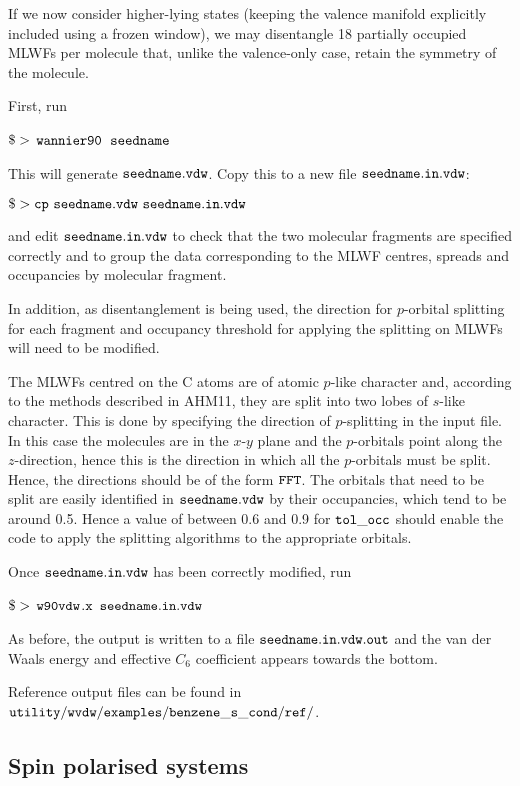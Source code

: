 \documentclass{report}
\newcommand{\wvdw}{{$\tt{w90vdw}$}}
\newcommand{\wannier}{{$\tt{wannier90}$}}
\begin{document}
If we now consider higher-lying states (keeping the valence manifold
explicitly included using a frozen window), we may disentangle 18
partially occupied MLWFs per molecule that, unlike the valence-only
case, retain the symmetry of the molecule. 

First, run 

$\tt{\$>}$ \wannier\ $\tt{seedname}$

This will generate $\tt{seedname.vdw}$. Copy this to a new file
$\tt{seedname.in.vdw}$:

$\tt{\$> cp\ seedname.vdw\ seedname.in.vdw}$

and edit $\tt{seedname.in.vdw}$ to check that the two molecular
fragments are specified correctly and to group the data corresponding
to the MLWF centres, spreads and occupancies by molecular fragment. 

In addition, as disentanglement is being used, the direction for
$p$-orbital splitting for each fragment and occupancy threshold for
applying the splitting on MLWFs will need to be modified. 

The MLWFs centred on the C atoms are of atomic $p$-like character and, 
according to the methods described in AHM11, they are split into two
lobes of $s$-like character. This is done by specifying the direction
of $p$-splitting in the input file. In this case the molecules are in
the $x$-$y$ plane and the $p$-orbitals point along the $z$-direction,
hence this is the direction in which all the $p$-orbitals must be
split. Hence, the directions should be of the form $\tt{F F T}$. The
orbitals that need to be split are easily identified in
$\tt{seedname.vdw}$ by their occupancies, which tend to be around
0.5. Hence a value of between 0.6 and 0.9 for $\tt{tol\_occ}$ should
enable the code to apply the splitting algorithms to the appropriate
orbitals. 

Once $\tt{seedname.in.vdw}$ has been correctly modified, run

$\tt{\$>}$ \wvdw$\tt{.x}$ $\tt{seedname.in.vdw}$

As before, the output is written to a file $\tt{seedname.in.vdw.out}$ 
and the van der Waals energy and effective $C_6$ coefficient appears 
towards the bottom.

Reference output files can be found in  
$\tt{utility/wvdw/examples/benzene\_s\_cond/ref/}$.


\subsection{Spin polarised systems} 
\end{document}
